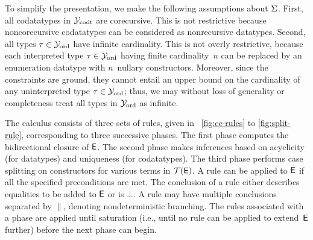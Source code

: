 To simplify the presentation, we make the following assumptions about $\mathrm{\Sigma}$.
First, all codatatypes in $\mathcal{Y}_{\mathrm{codt}}$ are corecursive. This is not restrictive
because noncorecursive codatatypes can be considered as nonrecursive
datatypes.
Second, all types $\tau \in \mathcal{Y}_{\mathrm{ord}}$ have infinite cardinality.
This is not overly restrictive, because each interpreted type $\tau \in \mathcal{Y}_{\mathrm{ord}}$
having finite cardinality~$n$
can be replaced by an enumeration datatype with $n$~nullary constructors.
Moreover, since the constraints are ground, they cannot entail an upper bound
on the cardinality of any uninterpreted type $\tau \in \mathcal{Y}_{\mathrm{ord}}$; thus,
we may without loss of generality or completeness treat all types in $\mathcal{Y}_{\mathrm{ord}}$ as infinite.

The calculus consists of three sets of rules, given in \figuresname~\ref{fig:cc-rules} to
\ref{fig:split-rule}, corresponding to three successive phases. The first
phase computes the bidirectional closure of $\mathsf{E}$. The second phase makes
inferences based on acyclicity (for datatypes) and uniqueness (for
codatatypes). The third phase performs case splitting on constructors for
various terms in $\mathcal{T}(\mathsf{E})$.
A rule can be applied to $\mathsf{E}$ if all the specified preconditions are met.
The conclusion of a rule either describes equalities to be added to $\mathsf{E}$
or is $\bot$.
A rule may have multiple conclusions separated by $\parallel$,
denoting nondeterministic branching. The rules associated with a phase are
applied until saturation (i.e., until no rule can be applied to extend~$\mathsf{E}$
further) before the next phase can begin.


